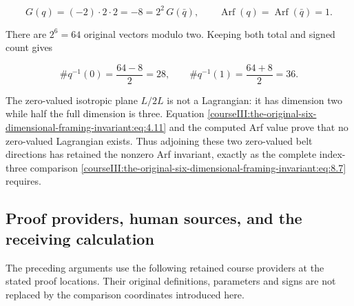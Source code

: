 \begin{equation}
G(q)=(-2)\cdot2\cdot2=-8
             =2^2\,G(\bar q),\qquad
       \operatorname{Arf}(q)=\operatorname{Arf}(\bar q)=1.
 \label{courseIII:the-original-six-dimensional-framing-invariant:eq:10.12}
\end{equation}

There are \(2^6=64\) original vectors modulo two. Keeping both total and signed count gives

\begin{equation}
\#q^{-1}(0)=\frac{64-8}{2}=28,\qquad
                    \#q^{-1}(1)=\frac{64+8}{2}=36.
 \label{courseIII:the-original-six-dimensional-framing-invariant:eq:10.13}
\end{equation}

The zero-valued isotropic plane \(L/2L\) is not a Lagrangian: it has dimension two while half the full dimension is three. Equation \eqref{courseIII:the-original-six-dimensional-framing-invariant:eq:4.11} and the computed Arf value prove that no zero-valued Lagrangian exists. Thus adjoining these two zero-valued belt directions has retained the nonzero Arf invariant, exactly as the complete index-three comparison \eqref{courseIII:the-original-six-dimensional-framing-invariant:eq:8.7} requires.

\subsection{Proof providers, human sources, and the receiving calculation}
\label{courseIII:the-original-six-dimensional-framing-invariant:framed-six-sources}

\label{courseIII:the-original-six-dimensional-framing-invariant:section-11}

The preceding arguments use the following retained course providers at the stated proof locations. Their original definitions, parameters and signs are not replaced by the comparison coordinates introduced here.

